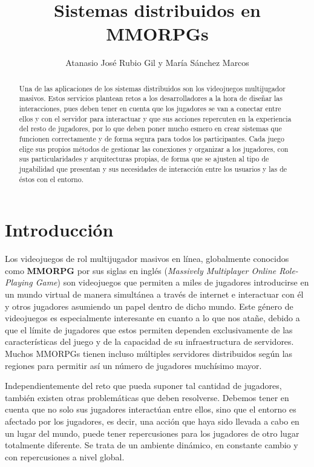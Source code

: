 \documentclass[runningheads]{llncs}
\title{Sistemas distribuidos en MMORPGs}
\author{Atanasio José Rubio Gil y María Sánchez Marcos}
\institute{Universidad de Granada, 18010 Granada, España}
\begin{document}
\maketitle

\begin{abstract}
Una de las aplicaciones de los sistemas distribuidos son los videojuegos multijugador masivos.
Estos servicios plantean retos a los desarrolladores a la hora de diseñar las interacciones, pues deben tener en cuenta que los jugadores se van a conectar entre ellos y con el servidor para interactuar y que sus acciones repercuten en la experiencia del resto de jugadores, por lo que deben poner mucho esmero en crear sistemas que funcionen correctamente y de forma segura para todos los participantes.
Cada juego elige sus propios métodos de gestionar las conexiones y organizar a los jugadores, con sus particularidades y arquitecturas propias, de forma que se ajusten al tipo de jugabilidad que presentan y sus necesidades de interacción entre los usuarios y las de éstos con el entorno.

\end{abstract}

\section{Introducción}

Los videojuegos de rol multijugador masivos en línea, globalmente conocidos como \textbf{MMORPG} por sus siglas en inglés (\textit{Massively Multiplayer Online Role-Playing Game}) son videojuegos que permiten a miles de jugadores introducirse en un mundo virtual de manera simultánea a través de internet e interactuar con él y otros jugadores asumiendo un papel dentro de dicho mundo.
Este género de videojuegos es especialmente interesante en cuanto a lo que nos atañe, debido a que el límite de jugadores que estos permiten dependen exclusivamente de las características del juego y de la capacidad de su infraestructura de servidores.
Muchos MMORPGs tienen incluso múltiples servidores distribuidos según las regiones para permitir así un número de jugadores muchísimo mayor.

Independientemente del reto que pueda suponer tal cantidad de jugadores, también existen otras problemáticas que deben resolverse.
Debemos tener en cuenta que no solo sus jugadores interactúan entre ellos, sino que el entorno es afectado por los jugadores, es decir, una acción que haya sido llevada a cabo en un lugar del mundo, puede tener repercusiones para los jugadores de otro lugar totalmente diferente.
Se trata de un ambiente dinámico, en constante cambio y con repercusiones a nivel global.
\end{document}
